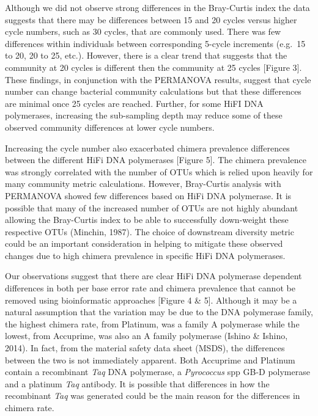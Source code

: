 \documentclass[12pt,]{article}
\begin{document}
Although we did not observe strong differences in the Bray-Curtis index
the data suggests that there may be differences between 15 and 20 cycles
versus higher cycle numbers, such as 30 cycles, that are commonly used.
There was few differences within individuals between corresponding
5-cycle increments (e.g.~15 to 20, 20 to 25, etc.). However, there is a
clear trend that suggests that the community at 20 cycles is different
then the community at 25 cycles {[}Figure 3{]}. These findings, in
conjunction with the PERMANOVA results, suggest that cycle number can
change bacterial community calculations but that these differences are
minimal once 25 cycles are reached. Further, for some HiFI DNA
polymerases, increasing the sub-sampling depth may reduce some of these
observed community differences at lower cycle numbers.

Increasing the cycle number also exacerbated chimera prevalence
differences between the different HiFi DNA polymerases {[}Figure 5{]}.
The chimera prevalence was strongly correlated with the number of OTUs
which is relied upon heavily for many community metric calculations.
However, Bray-Curtis analysis with PERMANOVA showed few differences
based on HiFi DNA polymerase. It is possible that many of the increased
number of OTUs are not highly abundant allowing the Bray-Curtis index to
be able to successfully down-weight these respective OTUs (Minchin,
1987). The choice of downstream diversity metric could be an important
consideration in helping to mitigate these observed changes due to high
chimera prevalence in specific HiFi DNA polymerases.

Our observations suggest that there are clear HiFi DNA polymerase
dependent differences in both per base error rate and chimera prevalence
that cannot be removed using bioinformatic approaches {[}Figure 4 \&
5{]}. Although it may be a natural assumption that the variation may be
due to the DNA polymerase family, the highest chimera rate, from
Platinum, was a family A polymerase while the lowest, from Accuprime,
was also an A family polymerase (Ishino \& Ishino, 2014). In fact, from
the material safety data sheet (MSDS), the differences between the two
is not immediately apparent. Both Accuprime and Platinum contain a
recombinant \emph{Taq} DNA polymerase, a \emph{Pyrococcus} spp GB-D
polymerase and a platinum \emph{Taq} antibody. It is possible that
differences in how the recombinant \emph{Taq} was generated could be the
main reason for the differences in chimera rate.

\newpage
\end{document}

